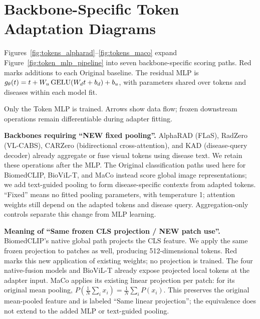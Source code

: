 \onecolumn
\section{Backbone-Specific Token Adaptation Diagrams}
\label{app:architectures}


\begingroup\small
Figures~\ref{fig:tokens_alpharad}--\ref{fig:tokens_maco} expand Figure~\ref{fig:token_mlp_pipeline} into seven backbone-specific scoring paths. Red marks additions to each Original baseline. The residual MLP is $g_\theta(t)=t+W_u\operatorname{GELU}(W_dt+b_d)+b_u$, with parameters shared over tokens and diseases within each model fit.

\begin{center}
\end{center}
Only the Token MLP is trained. Arrows show data flow; frozen downstream operations remain differentiable during adapter fitting.

\medskip
\noindent\textbf{Backbones requiring ``NEW fixed pooling''.}
AlphaRAD (FLaS), RadZero (VL-CABS), CARZero (bidirectional cross-attention), and KAD (disease-query decoder) already aggregate or fuse visual tokens using disease text. We retain these operations after the MLP. The Original classification paths used here for BiomedCLIP, BioViL-T, and MaCo instead score global image representations; we add text-guided pooling to form disease-specific contexts from adapted tokens. ``Fixed'' means no fitted pooling parameters, with temperature 1; attention weights still depend on the adapted tokens and disease query. Aggregation-only controls separate this change from MLP learning.

\medskip
\noindent\textbf{Meaning of ``Same frozen CLS projection / NEW patch use''.}
BiomedCLIP's native global path projects the CLS feature. We apply the same frozen projection to patches as well, producing 512-dimensional tokens. Red marks this new application of existing weights; no projection is trained. The four native-fusion models and BioViL-T already expose projected local tokens at the adapter input. MaCo applies its existing linear projection per patch: for its original mean pooling, $P(\frac{1}{N}\sum_i x_i)=\frac{1}{N}\sum_i P(x_i)$. This preserves the original mean-pooled feature and is labeled ``Same linear projection''; the equivalence does not extend to the added MLP or text-guided pooling.
\par\endgroup

